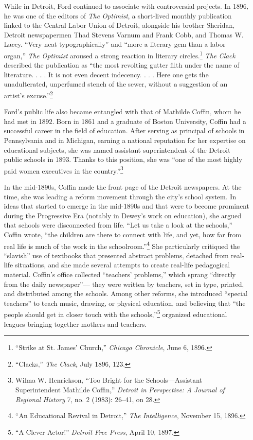 \documentclass[twoside,symmetric,nobib,justified]{tufte-book}
\begin{document}
While in Detroit, Ford continued to associate with controversial
projects. In 1896, he was one of the editors of \emph{The Optimist}, a
short-lived monthly publication linked to the Central Labor Union of
Detroit, alongside his brother Sheridan, Detroit newspapermen Thad
Stevens Varnum and Frank Cobb, and Thomas W. Lacey. ``Very neat
typographically'' and ``more a literary gem than a labor organ,''
\emph{The Optimist} aroused a strong reaction in literary
circles.\footnote{``Strike at St. James' Church,'' \emph{Chicago
  Chronicle}, June 6, 1896.} \emph{The Clack} described the publication
as ``the most revolting gutter filth under the name of literature. . . .
It is not even decent indecency. . . . Here one gets the unadulterated,
unperfumed stench of the sewer, without a suggestion of an artist's
excuse.''\footnote{``Clacks,'' \emph{The Clack}, July 1896, 123.}

Ford's public life also became entangled with that of Mathilde Coffin,
whom he had met in 1892. Born in 1861 and a graduate of Boston
University, Coffin had a successful career in the field of education.
After serving as principal of schools in Pennsylvania and in Michigan,
earning a national reputation for her expertise on educational subjects,
she was named assistant superintendent of the Detroit public schools in
1893. Thanks to this position, she was ``one of the most highly paid
women executives in the country.''\footnote{Wilma W. Henrickson, ``Too
  Bright for the Schools---Assistant Superintendent Mathilde Coffin,''
  \emph{Detroit in Perspective: A Journal of Regional History} 7, no. 2
  (1983): 26--41, on 28.}

In the mid-1890s, Coffin made the front page of the Detroit newspapers.
At the time, she was leading a reform movement through the city's school
system. In ideas that started to emerge in the mid-1890s and that were
to become prominent during the Progressive Era (notably in Dewey's work
on education), she argued that schools were disconnected from life.
``Let us take a look at the schools,'' Coffin wrote, ``the children are
there to connect with life, and yet, how far from real life is much of
the work in the schoolroom.''\footnote{``An Educational Revival in
  Detroit,'' \emph{The Intelligence}, November 15, 1896.} She
particularly critiqued the ``slavish'' use of textbooks that presented
abstract problems, detached from real-life situations, and she made
several attempts to create real-life pedagogical material. Coffin's
office collected ``teachers' problems,'' which sprang ``directly from
the daily newspaper''--- they were written by teachers, set in type,
printed, and distributed among the schools. Among other reforms, she
introduced ``special teachers'' to teach music, drawing, or physical
education, and believing that ``the people should get in closer touch
with the schools,''\footnote{``A Clever Actor!'' \emph{Detroit Free
  Press}, April 10, 1897.} organized educational leagues bringing
together mothers and teachers.
\end{document}
